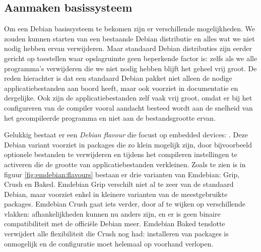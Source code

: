 \subsection{Aanmaken basissysteem}
\label{kiosk:deployment:besturingssysteem:basissysteem}

Om een Debian basissysteem te bekomen zijn er verschillende mogelijkheden. We zouden kunnen starten van een bestaande Debian distributie en alles wat we niet nodig hebben ervan verwijderen. Maar standaard Debian distributies zijn eerder gericht op toestellen waar opslagruimte geen beperkende factor is: zelfs als we alle programma's verwijderen die we niet nodig hebben blijft het geheel vrij groot. De reden hierachter is dat een standaard Debian pakket niet alleen de nodige applicatiebestanden aan boord heeft, maar ook voorziet in documentatie en dergelijke. Ook zijn de applicatiebestanden zelf vaak vrij groot, omdat er bij het configureren van de compiler vooral aandacht besteed wordt aan de snelheid van het gecompileerde programma en niet aan de bestandsgrootte ervan.

Gelukkig bestaat er een \emph{Debian flavour} die focust op embedded devices: . Deze Debian variant voorziet in packages die zo klein mogelijk zijn, door bijvoorbeeld optionele bestanden te verwijderen en tijdens het compileren instellingen te activeren die de grootte van applicatiebestanden verkleinen. Zoals te zien is in figuur \ref{fig:emdebian:flavours} bestaan er drie varianten van Emdebian: Grip, Crush en Baked. Emdebian Grip verschilt niet al te zeer van de standaard Debian, maar voorziet enkel in kleinere varianten van de meestgebruikte packages. Emdebian Crush gaat iets verder, door af te wijken op verschillende vlakken: afhankelijkheden kunnen nu anders zijn, en er is geen binaire compatibiliteit met de officiële Debian meer. Emdebian Baked tenslotte verwijdert alle flexibiliteit die Crush nog had: installeren van packages is onmogelijk en de configuratie moet helemaal op voorhand verlopen.

